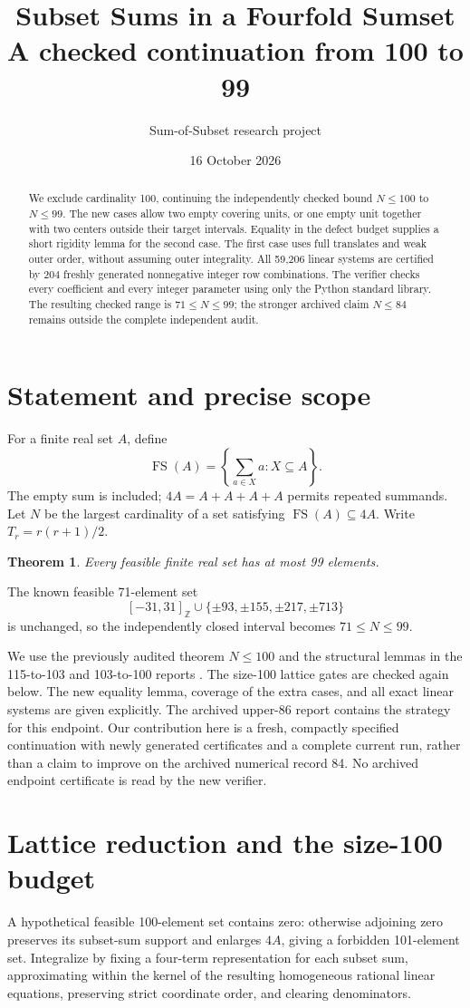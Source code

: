 \documentclass[11pt,a4paper]{article}
\title{Subset Sums in a Fourfold Sumset\\\large A checked continuation from 100 to 99}
\author{Sum-of-Subset research project}
\date{16 October 2026}
\newcommand{\FS}{\operatorname{FS}}
\newcommand{\Z}{\mathbb Z}
\newtheorem{theorem}{Theorem}[section]
\begin{document}
\maketitle
\begin{abstract}
We exclude cardinality 100, continuing the independently checked bound
$N\le100$ to $N\le99$. The new cases allow two empty covering units, or
one empty unit together with two centers outside their target intervals.
Equality in the defect budget supplies a short rigidity lemma for the
second case. The first case uses full translates and weak outer order,
without assuming outer integrality. All 59,206 linear systems are
certified by 204 freshly generated nonnegative integer row combinations.
The verifier checks every coefficient and every integer parameter using
only the Python standard library. The resulting checked range is
$71\le N\le99$; the stronger archived claim $N\le84$ remains outside
the complete independent audit.
\end{abstract}
\tableofcontents

\section{Statement and precise scope}
For a finite real set $A$, define
\[
 \FS(A)=\left\{\sum_{a\in X}a:X\subseteq A\right\}.
\]
The empty sum is included; $4A=A+A+A+A$ permits repeated summands.
Let $N$ be the largest cardinality of a set satisfying $\FS(A)\subseteq4A$.
Write $T_r=r(r+1)/2$.
\begin{theorem}\label{thm:main}
Every feasible finite real set has at most 99 elements.
\end{theorem}
The known feasible 71-element set
\[
 [-31,31]_{\Z}\cup\{\pm93,\pm155,\pm217,\pm713\}
\]
is unchanged, so the independently closed interval becomes $71\le N\le99$.

We use the previously audited theorem $N\le100$ and the structural
lemmas in the 115-to-103 and 103-to-100 reports \cite{base103,base100}.
The size-100 lattice gates are checked again below. The new equality
lemma, coverage of the extra cases, and all exact linear systems are
given explicitly. The archived upper-86 report \cite{archive} contains
the strategy for this endpoint. Our contribution here is a fresh,
compactly specified continuation with newly generated certificates and
a complete current run, rather than a claim to improve on the archived
numerical record 84. No archived endpoint certificate is read by the
new verifier.

\section{Lattice reduction and the size-100 budget}
A hypothetical feasible 100-element set contains zero: otherwise
adjoining zero preserves its subset-sum support and enlarges $4A$, giving
a forbidden 101-element set. Integralize by fixing a four-term
representation for each subset sum, approximating within the kernel of
the resulting homogeneous rational linear equations, preserving strict
coordinate order, and clearing denominators.
\end{document}
